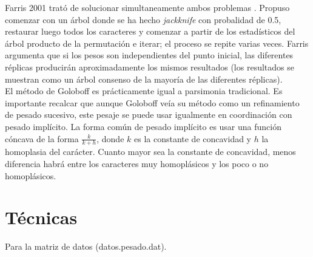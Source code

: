 Farris 2001 trat\'o de solucionar simultaneamente ambos problemas \cite{Farris2001}. Propuso comenzar con un \'arbol donde se ha hecho \textit{jackknife} con probalidad de 0.5, restaurar luego todos los caracteres y comenzar a partir de los estad\'isticos del \'arbol producto de la permutaci\'on e iterar; el proceso se repite varias veces. Farris argumenta que si los pesos son independientes del punto inicial, las diferentes r\'eplicas producir\'an aproximadamente los mismos resultados (los resultados se muestran como un \'arbol consenso de la mayor\'ia de las diferentes r\'eplicas).\\
El m\'etodo de Goloboff es pr\'acticamente igual a parsimonia tradicional. Es importante recalcar que aunque Goloboff ve\'ia su m\'etodo como un refinamiento de pesado sucesivo, este pesaje se puede usar igualmente en coordinaci\'on con pesado impl\'icito. La forma com\'un de pesado impl\'icito es usar una funci\'on c\'oncava de la forma $\frac{k}{k + h}$, donde $k$ es la constante de concavidad y $h$ la homoplasia del car\'acter. Cuanto mayor sea la constante de concavidad, menos diferencia habr\'a entre los caracteres muy homopl\'asicos y los poco o no homopl\'asicos.




\section*{T\'ecnicas}


Para la matriz de datos (datos.pesado.dat).

